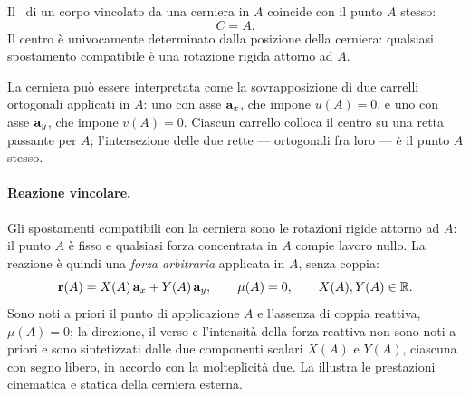 \begin{proposizione}
	\label{prop:CR_cerniera}
	Il \CRa\ di un corpo vincolato da una cerniera in $A$
	coincide con il punto $A$ stesso:
	\begin{equation}\label{eq:CR_cerniera}
		C = A.
	\end{equation}
	Il centro è univocamente determinato dalla posizione
	della cerniera: qualsiasi spostamento compatibile è
	una rotazione rigida attorno ad $A$.
\end{proposizione}

\begin{oss}
	La cerniera può essere interpretata come la
	sovrapposizione di due carrelli ortogonali applicati
	in $A$: uno con asse $\mathbf{a}_x$, che impone $u(A) = 0$,
	e uno con asse $\mathbf{a}_y$, che impone $v(A) = 0$. Ciascun
	carrello colloca il centro su una retta passante per
	$A$; l'intersezione delle due rette --- ortogonali fra
	loro --- è il punto $A$ stesso.
\end{oss}

\paragraph{Reazione vincolare.}
Gli spostamenti compatibili con la cerniera sono le rotazioni
rigide attorno ad $A$: il punto $A$ è fisso e qualsiasi forza
concentrata in $A$ compie lavoro nullo. La reazione è quindi
una \emph{forza arbitraria} applicata in $A$, senza coppia:
\begin{equation}\label{eq:reazione_cerniera}
	\mathbf{r}(A) = X(A)\,\mathbf{a}_x + Y(A)\,\mathbf{a}_y,
	\qquad
	\mu(A) = 0,
	\qquad
	X(A), Y(A) \in \mathbb{R}.
\end{equation}
Sono noti a priori il punto di applicazione $A$ e l'assenza
di coppia reattiva, $\mu(A) = 0$; la direzione, il verso e
l'intensità della forza reattiva non sono noti a priori e
sono sintetizzati dalle due componenti scalari $X(A)$ e
$Y(A)$, ciascuna con segno libero, in accordo con la
molteplicità due. La  illustra
le prestazioni cinematica e statica della cerniera esterna.






